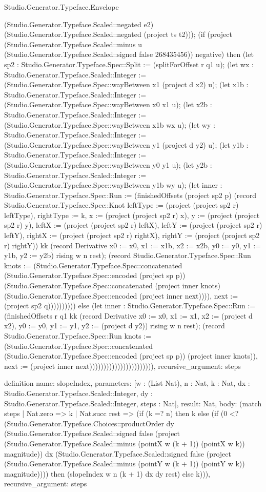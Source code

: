 \begin{lexlean}{Studio.Generator.Typeface.Envelope}
\begin{semanticmodule}
{(Studio.Generator.Typeface.Scaled::negated e2) (Studio.Generator.Typeface.Scaled::negated (project ts t2))); (if (project (Studio.Generator.Typeface.Scaled::minus u (Studio.Generator.Typeface.Scaled::signed false 268435456)) negative) then (let sp2 : Studio.Generator.Typeface.Spec::Split := (splitForOffset r q1 u); (let wx : Studio.Generator.Typeface.Scaled::Integer := (Studio.Generator.Typeface.Spec::wayBetween x1 (project d x2) u); (let x1b : Studio.Generator.Typeface.Scaled::Integer := (Studio.Generator.Typeface.Spec::wayBetween x0 x1 u); (let x2b : Studio.Generator.Typeface.Scaled::Integer := (Studio.Generator.Typeface.Spec::wayBetween x1b wx u); (let wy : Studio.Generator.Typeface.Scaled::Integer := (Studio.Generator.Typeface.Spec::wayBetween y1 (project d y2) u); (let y1b : Studio.Generator.Typeface.Scaled::Integer := (Studio.Generator.Typeface.Spec::wayBetween y0 y1 u); (let y2b : Studio.Generator.Typeface.Scaled::Integer := (Studio.Generator.Typeface.Spec::wayBetween y1b wy u); (let inner : Studio.Generator.Typeface.Spec::Run := (finishedOffsets (project sp2 p) (record Studio.Generator.Typeface.Spec::Knot {leftType := (project (project sp2 r) leftType), rightType := k, x := (project (project sp2 r) x), y := (project (project sp2 r) y), leftX := (project (project sp2 r) leftX), leftY := (project (project sp2 r) leftY), rightX := (project (project sp2 r) rightX), rightY := (project (project sp2 r) rightY)}) kk (record Derivative {x0 := x0, x1 := x1b, x2 := x2b, y0 := y0, y1 := y1b, y2 := y2b}) rising w n rest); (record Studio.Generator.Typeface.Spec::Run {knots := (Studio.Generator.Typeface.Spec::concatenated (Studio.Generator.Typeface.Spec::encoded (project sp p)) (Studio.Generator.Typeface.Spec::concatenated (project inner knots) (Studio.Generator.Typeface.Spec::encoded (project inner next)))), next := (project sp2 q)}))))))))) else (let inner : Studio.Generator.Typeface.Spec::Run := (finishedOffsets r q1 kk (record Derivative {x0 := x0, x1 := x1, x2 := (project d x2), y0 := y0, y1 := y1, y2 := (project d y2)}) rising w n rest); (record Studio.Generator.Typeface.Spec::Run {knots := (Studio.Generator.Typeface.Spec::concatenated (Studio.Generator.Typeface.Spec::encoded (project sp p)) (project inner knots)), next := (project inner next)})))))))))))))))))))))),
  recursive_argument: steps
}

definition{
  name: slopeIndex,
  parameters: [w : (List Nat), n : Nat, k : Nat, dx : Studio.Generator.Typeface.Scaled::Integer, dy : Studio.Generator.Typeface.Scaled::Integer, steps : Nat],
  result: Nat,
  body: (match steps
    | Nat.zero => k
    | Nat.succ rest => (if (k =? n) then k else (if (0 <? (Studio.Generator.Typeface.Choices::productOrder dy (Studio.Generator.Typeface.Scaled::signed false (project (Studio.Generator.Typeface.Scaled::minus (pointX w (k + 1)) (pointX w k)) magnitude)) dx (Studio.Generator.Typeface.Scaled::signed false (project (Studio.Generator.Typeface.Scaled::minus (pointY w (k + 1)) (pointY w k)) magnitude)))) then (slopeIndex w n (k + 1) dx dy rest) else k))),
  recursive_argument: steps
}


\end{semanticmodule}
\end{lexlean}
